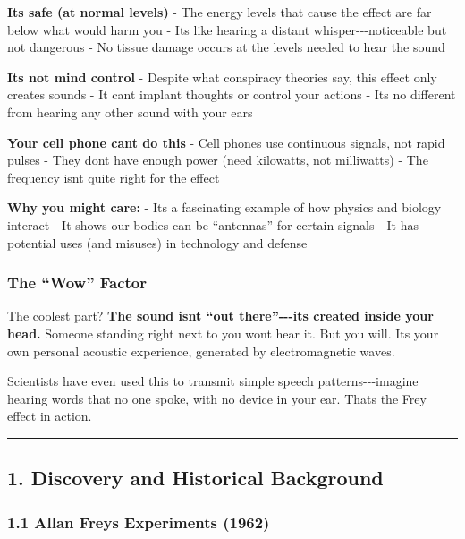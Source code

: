 \textbf{It\textquotesingle s safe (at normal levels)} - The energy
levels that cause the effect are far below what would harm you -
It\textquotesingle s like hearing a distant whisper-\/-\/-noticeable but
not dangerous - No tissue damage occurs at the levels needed to hear the
sound

\textbf{It\textquotesingle s not mind control} - Despite what conspiracy
theories say, this effect only creates sounds - It can\textquotesingle t
implant thoughts or control your actions - It\textquotesingle s no
different from hearing any other sound with your ears

\textbf{Your cell phone can\textquotesingle t do this} - Cell phones use
continuous signals, not rapid pulses - They don\textquotesingle t have
enough power (need kilowatts, not milliwatts) - The frequency
isn\textquotesingle t quite right for the effect

\textbf{Why you might care:} - It\textquotesingle s a fascinating
example of how physics and biology interact - It shows our bodies can be
``antennas'' for certain signals - It has potential uses (and misuses)
in technology and defense

\subsubsection{The ``Wow'' Factor}\label{the-wow-factor}

The coolest part? \textbf{The sound isn\textquotesingle t ``out
there''-\/-\/-it\textquotesingle s created inside your head.} Someone
standing right next to you won\textquotesingle t hear it. But you will.
It\textquotesingle s your own personal acoustic experience, generated by
electromagnetic waves.

Scientists have even used this to transmit simple speech
patterns-\/-\/-imagine hearing words that no one spoke, with no device
in your ear. That\textquotesingle s the Frey effect in action.

\begin{center}\rule{0.5\linewidth}{0.5pt}\end{center}

\subsection{1. Discovery and Historical
Background}\label{discovery-and-historical-background}

\subsubsection{1.1 Allan Frey\textquotesingle s Experiments
(1962)}\label{allan-freys-experiments-1962}

